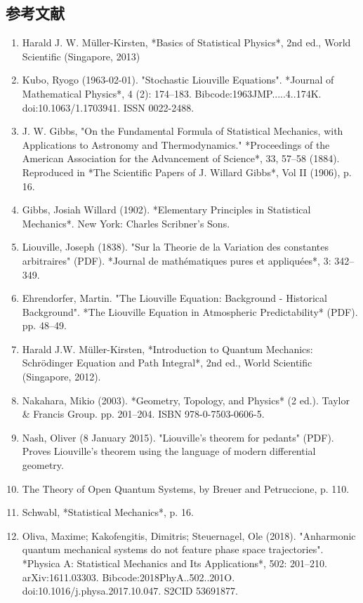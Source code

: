 \subsection{参考文献}  
\begin{enumerate}
\item Harald J. W. Müller-Kirsten, *Basics of Statistical Physics*, 2nd ed., World Scientific (Singapore, 2013)  
\item Kubo, Ryogo (1963-02-01). "Stochastic Liouville Equations". *Journal of Mathematical Physics*, 4 (2): 174–183. Bibcode:1963JMP.....4..174K. doi:10.1063/1.1703941. ISSN 0022-2488.  
\item J. W. Gibbs, "On the Fundamental Formula of Statistical Mechanics, with Applications to Astronomy and Thermodynamics." *Proceedings of the American Association for the Advancement of Science*, 33, 57–58 (1884). Reproduced in *The Scientific Papers of J. Willard Gibbs*, Vol II (1906), p. 16.  
\item Gibbs, Josiah Willard (1902). *Elementary Principles in Statistical Mechanics*. New York: Charles Scribner's Sons.  
\item Liouville, Joseph (1838). "Sur la Theorie de la Variation des constantes arbitraires" (PDF). *Journal de mathématiques pures et appliquées*, 3: 342–349.  
\item Ehrendorfer, Martin. "The Liouville Equation: Background - Historical Background". *The Liouville Equation in Atmospheric Predictability* (PDF). pp. 48–49.  
\item Harald J.W. Müller-Kirsten, *Introduction to Quantum Mechanics: Schrödinger Equation and Path Integral*, 2nd ed., World Scientific (Singapore, 2012).  
\item Nakahara, Mikio (2003). *Geometry, Topology, and Physics* (2 ed.). Taylor & Francis Group. pp. 201–204. ISBN 978-0-7503-0606-5.  
\item Nash, Oliver (8 January 2015). "Liouville's theorem for pedants" (PDF). Proves Liouville's theorem using the language of modern differential geometry.  
\item The Theory of Open Quantum Systems, by Breuer and Petruccione, p. 110.
\item Schwabl, *Statistical Mechanics*, p. 16.  
\item Oliva, Maxime; Kakofengitis, Dimitris; Steuernagel, Ole (2018). "Anharmonic quantum mechanical systems do not feature phase space trajectories". *Physica A: Statistical Mechanics and Its Applications*, 502: 201–210. arXiv:1611.03303. Bibcode:2018PhyA..502..201O. doi:10.1016/j.physa.2017.10.047. S2CID 53691877.  

\end{enumerate}
